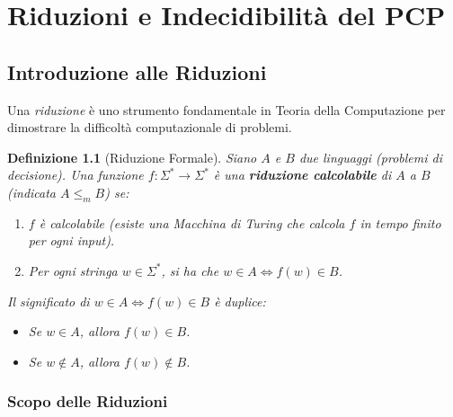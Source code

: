 \documentclass[a4paper, 11pt]{book} %
\newtheorem{definition}[theorem]{Definizione}
\theoremstyle{definition}
\begin{document}

\chapter{Riduzioni e Indecidibilità del PCP}



\section{Introduzione alle Riduzioni}

Una \emph{riduzione} è uno strumento fondamentale in Teoria della Computazione per dimostrare la difficoltà computazionale di problemi.

\begin{definition}[Riduzione Formale]
Siano $A$ e $B$ due linguaggi (problemi di decisione). Una funzione $f: \Sigma^* \to \Sigma^*$ è una \textbf{riduzione calcolabile} di $A$ a $B$ (indicata $A \le_m B$) se:
\begin{enumerate}
    \item $f$ è calcolabile (esiste una Macchina di Turing che calcola $f$ in tempo finito per ogni input).
    \item Per ogni stringa $w \in \Sigma^*$, si ha che $w \in A \iff f(w) \in B$.
\end{enumerate}
Il significato di $w \in A \iff f(w) \in B$ è duplice:
\begin{itemize}
    \item Se $w \in A$, allora $f(w) \in B$.
    \item Se $w \notin A$, allora $f(w) \notin B$.
\end{itemize}
\end{definition}

\subsection{Scopo delle Riduzioni}
\end{document}
